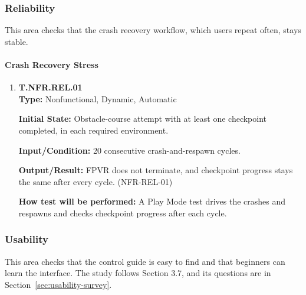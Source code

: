 \documentclass[12pt, titlepage]{article}
\begin{document}
\subsubsection{Reliability}

This area checks that the crash recovery workflow, which users repeat often, stays
stable.

{\sloppy
\paragraph{Crash Recovery Stress}

\begin{enumerate}

\item{\hypertarget{test-nfr-rel-01}{}\textbf{T.NFR.REL.01}\\}
\textbf{Type:} Nonfunctional, Dynamic, Automatic

\textbf{Initial State:} Obstacle-course attempt with at least one checkpoint completed,
in each required environment.

\textbf{Input/Condition:} 20 consecutive crash-and-respawn cycles.

\textbf{Output/Result:} FPVR does not terminate, and checkpoint progress stays the same
after every cycle. (\mbox{NFR-REL-01})

\textbf{How test will be performed:} A Play Mode test drives the crashes and respawns
and checks checkpoint progress after each cycle.

\end{enumerate}
\par}

\subsubsection{Usability}

This area checks that the control guide is easy to find and that beginners can learn the
interface. The study follows Section 3.7, and its questions are in
Section~\ref{sec:usability-survey}.
\end{document}

